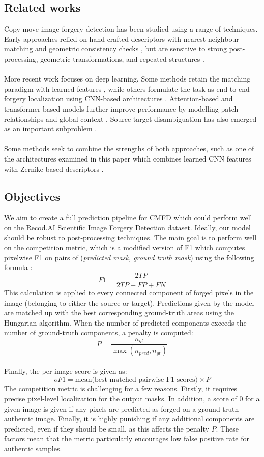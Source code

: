 \documentclass[final]{nldl}
\begin{document}
\subsection{Related works}
Copy-move image forgery detection has been studied using a range of techniques. Early approaches relied on hand-crafted descriptors with nearest-neighbour matching and geometric consistency checks \cite{fridrich2003copymove,christlein2012evaluation}, but are sensitive to strong post-processing, geometric transformations, and repeated structures \cite{christlein2012evaluation}.
\\\\
More recent work focuses on deep learning. Some methods retain the matching paradigm with learned features \cite{liu2022twostage}, while others formulate the task as end-to-end forgery localization using CNN-based architectures \cite{wu2018busternet}. Attention-based and transformer-based models further improve performance by modelling patch relationships and global context \cite{islam2020doagan, liu2024cmfdformer}. Source-target disambiguation has also emerged as an important subproblem \cite{barni2021copymove}. 
\\\\
Some methods seek to combine the strengths of both approaches, such as one of the architectures examined in this paper which combines learned CNN features with Zernike-based descriptors \cite{li2024deeppatchmatch}.

\subsection{Objectives}
We aim to create a full prediction pipeline for CMFD which could perform well on the Recod.AI Scientific Image Forgery Detection dataset. Ideally, our model should be robust to post-processing techniques. The main goal is to perform well on the competition metric, which is a modified version of F1 which computes pixelwise F1 on pairs of (\emph{predicted mask, ground truth mask}) using the following formula \cite{metric}:
\[
F1 = \frac{2TP}{2TP + FP + FN}
\]
This calculation is applied to every connected component of forged pixels in the image (belonging to either the source or target). Predictions given by the model are matched up with the best corresponding ground-truth areas using the Hungarian algorithm.
When the number of predicted components exceeds the number of ground-truth components, a penalty is computed:
\[
P = \frac{n_{gt}}{\max({n_{pred}, n_{gt}})}
\]
\\
Finally, the per-image score is given as:
\[
oF1 = \text{mean(best matched pairwise F1 scores)} \times P
\]
The competition metric is challenging for a few reasons. Firstly, it requires precise pixel-level localization for the output masks. In addition, a score of $0$ for a given image is given if any pixels are predicted as forged on a ground-truth authentic image. Finally, it is highly punishing if any additional components are predicted, even if they should be small, as this affects the penalty $P$. These factors mean that the metric particularly encourages low false positive rate for authentic samples. 
\end{document}
